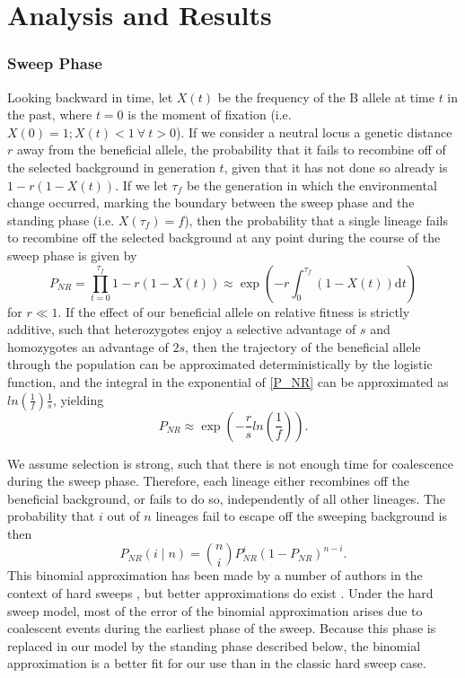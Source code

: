 \documentclass[a4paper,10pt]{article}
\begin{document}
\section{Analysis and Results}

\subsubsection*{Sweep Phase}

Looking backward in time, let $X\left(t\right)$ be the frequency of the B allele at time $t$ in the past, where $t=0$ is the moment of fixation (i.e. $X\left(0\right) = 1; X\left(t\right) < 1\ \forall\ t > 0$). If we consider a neutral locus a genetic distance $r$ away from the beneficial allele, the probability that it fails to recombine off of the selected background in generation $t$, given that it has not done so already is $1-r\left(1-X(t)\right)$. If we let $\tau_{f}$ be the generation in which the environmental change occurred, marking the boundary between the sweep phase and the standing phase (i.e. $X\left(\tau_{f}\right) = f$), then the probability that a single lineage fails to recombine off the selected background at any point during the course of the sweep phase is given by
\begin{equation}
P_{NR} = \prod_{t=0}^{\tau_{f}} 1-r\left(1-X(t)\right)  \approx \exp \left(-r \int_0^{\tau_{f}}(1-X\left(t\right))\mathrm{d} t \right) \label{P_NR}
\end{equation}
for $r \ll 1$. If the effect of our beneficial allele on relative fitness is strictly additive, such that heterozygotes enjoy a selective advantage of $s$ and homozygotes an advantage of $2s$, then the trajectory of the beneficial allele through the population can be approximated deterministically by the logistic function, and the integral in the exponential of \eqref{P_NR} can be approximated as $ln\left(\frac{1}{f}\right) \frac{1}{s}$, yielding
\begin{equation}
	P_{NR} \approx \exp \left(-\frac{r}{s}ln\left(\frac{1}{f}\right)\right).
\end{equation}

We assume selection is strong, such that there is not enough time for coalescence during the sweep phase. Therefore, each lineage either recombines off the beneficial background, or fails to do so, independently of all other lineages. The probability that $i$ out of $n$ lineages fail to escape off the sweeping background is then
\begin{equation}
P_{NR}(i \mid n) = {n \choose i} P_{NR}^{i} (1-P_{NR})^{n-i}.
\end{equation}
This binomial approximation has been made by a number of authors in the context of hard sweeps \citep[e.g. ][]{Smith1974,Fay:2000us,McVean:2006ke}, but better approximations do exist \citep{Barton1998,Durrett:2004fl,Durrett:2005fr,Schweinsberg:2005eh,Etheridge:2006fk,Messer:2012ie}. Under the hard sweep model, most of the error of the binomial approximation arises due to coalescent events during the earliest phase of the sweep. Because this phase is replaced in our model by the standing phase described below, the binomial approximation is a better fit for our use than in the classic hard sweep case. 
\end{document}
